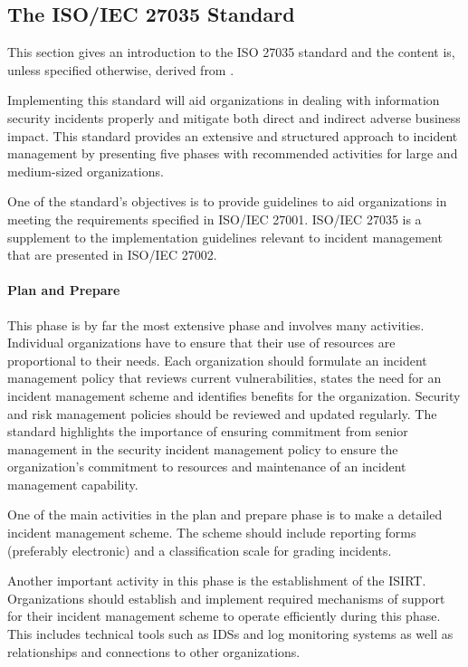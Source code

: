 \subsection{The \acs{ISO}/\acs{IEC} 27035 Standard}
\label{sec:iso27035}
This section gives an introduction to the ISO 27035 standard and the content is, unless specified otherwise, derived from \cite{ISO/IEC27035}. 

Implementing this standard will aid organizations in dealing with information security incidents properly and mitigate both direct and indirect adverse business impact. This standard provides an extensive and structured approach to incident management by presenting five phases with recommended activities for large and medium-sized organizations. 

One of the standard's objectives is to provide guidelines to aid organizations in meeting the requirements specified in ISO/IEC 27001. ISO/IEC 27035 is a supplement to the implementation guidelines relevant to incident management that are presented in ISO/IEC 27002.

\paragraph{Plan and Prepare} This phase is by far the most extensive phase and involves many activities. Individual organizations have to ensure that their use of resources are proportional to their needs. Each organization should formulate an incident management policy that reviews current vulnerabilities, states the need for an incident management scheme and identifies benefits for the organization. Security and risk management policies should be reviewed and updated regularly. The standard highlights the importance of ensuring commitment from senior management in the security incident management policy to ensure the organization's commitment to resources and maintenance of an incident management capability.  

One of the main activities in the plan and prepare phase is to make a detailed incident management scheme. The scheme should include reporting forms (preferably electronic) and a classification scale for grading incidents.   

Another important activity in this phase is the establishment of the \acf{ISIRT}. Organizations should establish and implement required mechanisms of support for their incident management scheme to operate efficiently during this phase. This includes technical tools such as \acp{IDS} and log monitoring systems as well as relationships and connections to other organizations. 

